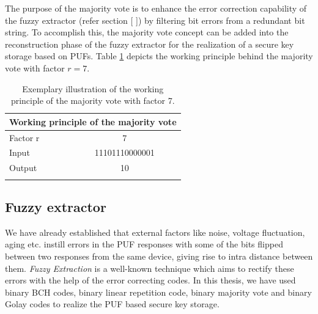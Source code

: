 The purpose of the majority vote is to enhance the error correction capability of the fuzzy extractor (refer section [ ]) by filtering bit errors from a redundant bit string. To accomplish this, the majority vote concept can be added into the reconstruction phase of the fuzzy extractor for the realization of a secure key storage based on PUFs. Table \ref{mv} depicts the working principle behind the majority vote with factor $r = 7$.

\begin{table}[!ht]
\begin{center}
\begin{tabular}{lc}
\toprule
\multicolumn{2}{c}{\textbf{Working principle of the majority vote}}\\
\midrule
Factor r & 7 \\
Input & 11101110000001\\
Output & 10\\
\addlinespace
\bottomrule
\end{tabular}
\end{center}
\caption{Exemplary illustration of the working principle of the majority vote with factor 7.}
\label{mv}
\end{table}

\subsection{Fuzzy extractor}
\label{fuzzy_section}
We have already established that external factors like noise, voltage fluctuation, aging etc. instill errors in the PUF responses with some of the bits flipped between two responses from the same device, giving rise to intra distance between them. \emph{Fuzzy Extraction} is a well-known technique which aims to rectify these errors with the help of the error correcting codes. In this thesis, we have used binary BCH codes, binary linear repetition code, binary majority vote and binary Golay
codes to realize the PUF based secure key storage.\\

